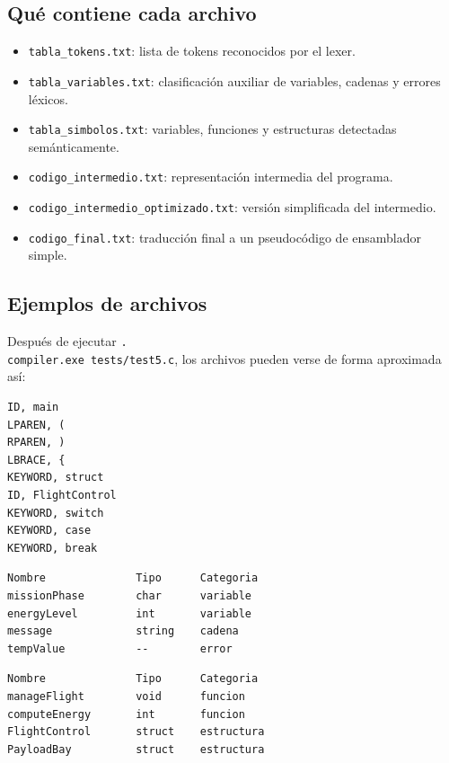 \documentclass[12pt]{article}
\begin{document}
\subsection{Qué contiene cada archivo}
\begin{itemize}[label={-}]
    \item \texttt{tabla\_tokens.txt}: lista de tokens reconocidos por el lexer.
    \item \texttt{tabla\_variables.txt}: clasificación auxiliar de variables, cadenas y errores léxicos.
    \item \texttt{tabla\_simbolos.txt}: variables, funciones y estructuras detectadas semánticamente.
    \item \texttt{codigo\_intermedio.txt}: representación intermedia del programa.
    \item \texttt{codigo\_intermedio\_optimizado.txt}: versión simplificada del intermedio.
    \item \texttt{codigo\_final.txt}: traducción final a un pseudocódigo de ensamblador simple.
\end{itemize}

\subsection{Ejemplos de archivos}
Después de ejecutar \texttt{.\\compiler.exe tests/test5.c}, los archivos pueden verse de forma aproximada así:

\begin{lstlisting}[language={}, caption={Ejemplo de tabla de tokens}]
ID, main
LPAREN, (
RPAREN, )
LBRACE, {
KEYWORD, struct
ID, FlightControl
KEYWORD, switch
KEYWORD, case
KEYWORD, break
\end{lstlisting}

\begin{lstlisting}[language={}, caption={Ejemplo de tabla de variables}]
Nombre              Tipo      Categoria
missionPhase        char      variable
energyLevel         int       variable
message             string    cadena
tempValue           --        error
\end{lstlisting}

\begin{lstlisting}[language={}, caption={Ejemplo de tabla de símbolos}]
Nombre              Tipo      Categoria
manageFlight        void      funcion
computeEnergy       int       funcion
FlightControl       struct    estructura
PayloadBay          struct    estructura
\end{lstlisting}
\end{document}

